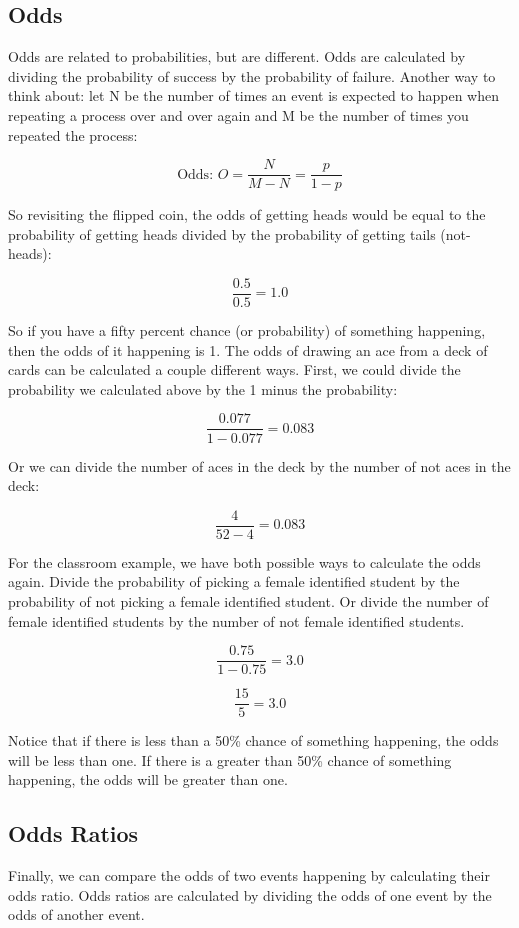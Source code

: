 \documentclass[12pt]{amsart}
\begin{document}
\subsection{Odds}

Odds are related to probabilities, but are different. Odds are calculated by dividing the probability of success by the probability of failure. Another way to think about: let N be the number of times an event is expected to happen when repeating a process over and over again and M be the number of times you repeated the process:

\[ \text{Odds: } O = \frac{N}{M-N} = \frac{p}{1-p} \]

So revisiting the flipped coin, the odds of getting heads would be equal to the probability of getting heads divided by the probability of getting tails (not-heads):

\[ \frac{0.5}{0.5} = 1.0 \]

So if you have a fifty percent chance (or probability) of something happening, then the odds of it happening is 1. The odds of drawing an ace from a deck of cards can be calculated a couple different ways. First, we could divide the probability we calculated above by the 1 minus the probability:

\[ \frac{0.077}{1-0.077} = 0.083 \]

Or we can divide the number of aces in the deck by the number of not aces in the deck:

\[ \frac{4}{52-4} = 0.083 \]

For the classroom example, we have both possible ways to calculate the odds again. Divide the probability of picking a female identified student by the probability of not picking a female identified student. Or divide the number of female identified students by the number of not female identified students.

\[ \frac{0.75}{1-0.75} = 3.0 \]

\[ \frac{15}{5} = 3.0 \]

Notice that if there is less than a 50\% chance of something happening, the odds will be less than one. If there is a greater than 50\% chance of something happening, the odds will be greater than one.

\newpage

\subsection{Odds Ratios}

Finally, we can compare the odds of two events happening by calculating their odds ratio. Odds ratios are calculated by dividing the odds of one event by the odds of another event.
\end{document}
